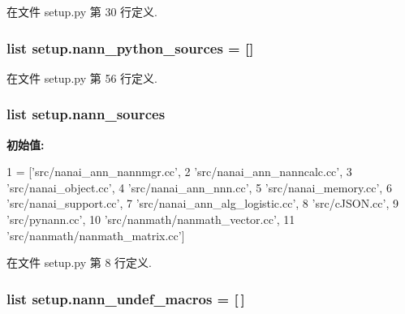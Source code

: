 在文件 setup.\+py 第 30 行定义.

\hypertarget{namespacesetup_ada29bda9ada755db57f408d28c2e0b7b}{}
\subsubsection[{nann\+\_\+python\+\_\+sources}]{\setlength{\rightskip}{0pt plus 5cm}list setup.\+nann\+\_\+python\+\_\+sources = \mbox{[}\textquotesingle{}\textquotesingle{}\mbox{]}}\label{namespacesetup_ada29bda9ada755db57f408d28c2e0b7b}


在文件 setup.\+py 第 56 行定义.

\hypertarget{namespacesetup_a4b5f9185c7fc55c9c97ee2ff3565c4ae}{}
\subsubsection[{nann\+\_\+sources}]{\setlength{\rightskip}{0pt plus 5cm}list setup.\+nann\+\_\+sources}\label{namespacesetup_a4b5f9185c7fc55c9c97ee2ff3565c4ae}
{\bfseries 初始值\+:}
\begin{DoxyCode}
1 = [\textcolor{stringliteral}{'src/nanai\_ann\_nannmgr.cc'},
2                 \textcolor{stringliteral}{'src/nanai\_ann\_nanncalc.cc'},
3                 \textcolor{stringliteral}{'src/nanai\_object.cc'},
4                 \textcolor{stringliteral}{'src/nanai\_ann\_nnn.cc'},
5                 \textcolor{stringliteral}{'src/nanai\_memory.cc'},
6                 \textcolor{stringliteral}{'src/nanai\_support.cc'},
7                 \textcolor{stringliteral}{'src/nanai\_ann\_alg\_logistic.cc'},
8                 \textcolor{stringliteral}{'src/cJSON.cc'},
9                 \textcolor{stringliteral}{'src/pynann.cc'},
10                 \textcolor{stringliteral}{'src/nanmath/nanmath\_vector.cc'},
11                 \textcolor{stringliteral}{'src/nanmath/nanmath\_matrix.cc'}]
\end{DoxyCode}


在文件 setup.\+py 第 8 行定义.

\hypertarget{namespacesetup_af38ce6c9c3a49620b55d56731ddc9e25}{}
\subsubsection[{nann\+\_\+undef\+\_\+macros}]{\setlength{\rightskip}{0pt plus 5cm}list setup.\+nann\+\_\+undef\+\_\+macros = \mbox{[}$\,$\mbox{]}}\label{namespacesetup_af38ce6c9c3a49620b55d56731ddc9e25}


